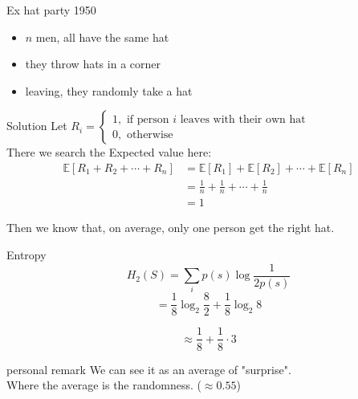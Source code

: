 \begin{parag}{Ex hat party 1950}
    \begin{itemize}
        \item $n$ men, all have the same hat
        \item they throw hats in a corner
        \item leaving, they randomly take a hat
    \end{itemize}
    \begin{subparag}{Solution}
        Let $R_i = \begin{cases}
            1, \text{ if person } i \text{ leaves with their own hat} \\
            0, \text{ otherwise}
        \end{cases}$\\
    There we search the Expected value here:
    \begin{align*} 
        \mathbb{E}\left[R_1 + R_2 + \cdots + R_n\right] &= \mathbb{E}\left[R_1\right] + \mathbb{E}\left[R_2\right] + \cdots + \mathbb{E}\left[R_n\right]\\
                                                        &= \frac{1}{n} + \frac{1}{n} + \cdots + \frac{1}{n}\\
                                                        &= 1
    \end{align*}

   Then we know that, on average, only one person get the right hat.
    \end{subparag}

\end{parag}
\begin{parag}{Entropy}
    \begin{equation} H_2(S) =\sum_i p(s)\log \frac{1}{2p(s)} \end{equation}
    \begin{equation} = \frac{1}{8}\log_2 \frac{8}{2} + \frac{1}{8} \log_2 8 \end{equation}
   
    
    \begin{equation} \approx \frac{1}{8} + \frac{1}{8} \cdot 3 \end{equation}
    
  \begin{subparag}{personal remark}
      We can see it as an average of "surprise".
      \\
      Where the average is the randomness. ($\approx 0.55$)
  \end{subparag}  
\end{parag}

